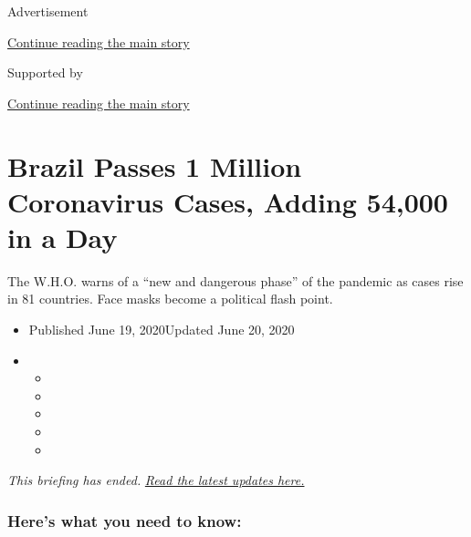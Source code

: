 Advertisement

\protect\hyperlink{after-top}{Continue reading the main story}

Supported by

\protect\hyperlink{after-sponsor}{Continue reading the main story}

\hypertarget{brazil-passes-1-million-coronavirus-cases-adding-54000-in-a-day}{%
\section{Brazil Passes 1 Million Coronavirus Cases, Adding 54,000 in a
Day}\label{brazil-passes-1-million-coronavirus-cases-adding-54000-in-a-day}}

The W.H.O. warns of a ``new and dangerous phase'' of the pandemic as
cases rise in 81 countries. Face masks become a political flash point.

\begin{itemize}
\item
  Published June 19, 2020Updated June 20, 2020
\item
  \begin{itemize}
  \item
  \item
  \item
  \item
  \item
  \end{itemize}
\end{itemize}

\emph{This briefing has ended.}
\href{https://www.nytimes.com/2020/06/20/world/coronavirus-updates.html}{\emph{Read
the latest updates here.}}

\hypertarget{heres-what-you-need-to-know}{%
\subsubsection{Here's what you need to
know:}\label{heres-what-you-need-to-know}}

